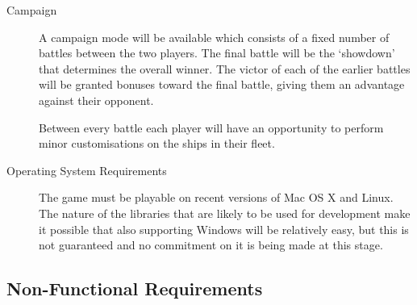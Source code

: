 \begin{description}
	\item[Campaign] A campaign mode will be available which consists of a fixed number of battles between the two players.
	The final battle will be the `showdown' that determines the overall winner. The victor of each of
	the earlier battles will be granted bonuses toward the final battle, giving them an advantage against
	their opponent.

	Between every battle each player will have an opportunity to perform minor customisations on
	the ships in their fleet.

	\item[Operating System Requirements] The game must be playable on recent versions of Mac OS X and Linux. The nature of the libraries that are likely to be used for development make it possible that also supporting Windows will be relatively easy, but this is not guaranteed and no commitment on it is being made at this stage.


\end{description}

\subsection{Non-Functional Requirements}

